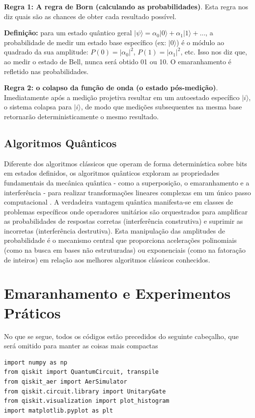 \documentclass[12pt, a4paper]{article}
\newcommand{\ket}[1]{\lvert #1 \rangle}
\begin{document}
{\bf Regra 1: A regra de Born (calculando as probabilidades)}. Esta regra nos diz quais são as chances de obter cada resultado possível. 

\textbf{Definição:} para um estado quântico geral $\ket{\psi} = \alpha_0\ket{0}+\alpha_1\ket{1}+...$, a probabilidade de medir um estado base específico (ex: $\ket{0}$) é o módulo ao quadrado da sua amplitude: $P(0) = |\alpha_0|^2$, $P(1) = |\alpha_1|^2$, etc. Isso nos diz que, ao medir o estado de Bell, nunca será obtido 01 ou 10. O emaranhamento é refletido nas probabilidades.

{\bf Regra 2: o colapso da função de onda (o estado pós-medição)}. Imediatamente após a medição projetiva resultar em um autoestado específico $\ket{i}$, o sistema colapsa para $\ket{i}$, de modo que medições subsequentes na mesma base retornarão deterministicamente o mesmo resultado.

\subsection{Algoritmos Quânticos}

Diferente dos algoritmos clássicos que operam de forma determinística sobre bits em estados definidos, os algoritmos quânticos exploram as propriedades fundamentais da mecânica quântica - como a superposição, o emaranhamento e a interferência - para realizar transformações lineares complexas em um único passo computacional \cite{abhijith2022quantum}. A verdadeira vantagem quântica manifesta-se em classes de problemas específicos onde operadores unitários são orquestrados para amplificar as probabilidades de respostas corretas (interferência construtiva) e suprimir as incorretas (interferência destrutiva). Esta manipulação das amplitudes de probabilidade é o mecanismo central que proporciona acelerações polinomiais (como na busca em bases não estruturadas) ou exponenciais (como na fatoração de inteiros) em relação aos melhores algoritmos clássicos conhecidos.

\section{Emaranhamento e Experimentos Práticos}

No que se segue, todos os códigos estão precedidos do seguinte cabeçalho, que será omitido para manter as coisas mais compactas

\begin{lstlisting}[caption={Cabeçalho básico para todos os códigos usando Qiskit}]
import numpy as np
from qiskit import QuantumCircuit, transpile
from qiskit_aer import AerSimulator
from qiskit.circuit.library import UnitaryGate
from qiskit.visualization import plot_histogram
import matplotlib.pyplot as plt
\end{lstlisting}
\end{document}
